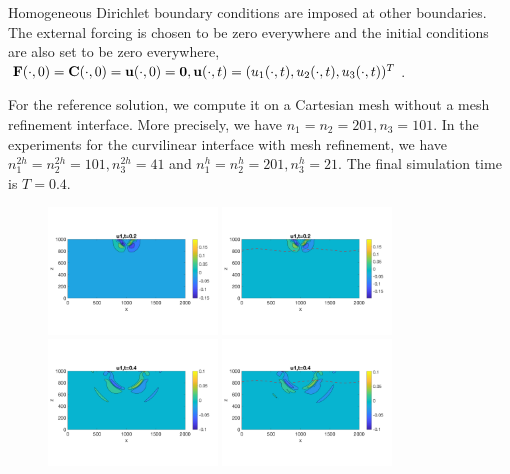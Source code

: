 Homogeneous Dirichlet boundary conditions are imposed at other boundaries. The external forcing is chosen to be zero everywhere and the initial conditions are also set to be zero everywhere, ${\bf F}(\cdot,0) = {\bf C}(\cdot,0) = {\bf u}(\cdot,0) = {\bf 0}, {\bf u}(\cdot,t) = (u_1(\cdot,t), u_2(\cdot,t), u_3(\cdot,t))^T$.

For the reference solution, we compute it on a Cartesian mesh without a mesh refinement interface. More precisely, we have $n_1 = n_2 = 201, n_3 = 101$. In the experiments for the curvilinear interface with mesh refinement, we have $n_1^{2h} = n_2^{2h} = 101, n_3^{2h} = 41$ and $n_1^h = n_2^h = 201, n_3^h = 21$. The final simulation time is $T = 0.4$.

\begin{figure}[htbp]
	\centering
	\includegraphics[width=0.4\textwidth,trim={0 2.8cm 0 2.8cm}, clip]{u1_t02_cartesian.png}
	\includegraphics[width=0.4\textwidth,trim={0 2.8cm 0 2.8cm}, clip]{u1_t02_curvi_mr.png}\\
	\includegraphics[width=0.4\textwidth,trim={0 2.8cm 0 2.8cm}, clip]{u1_t04_cartesian.png}
	\includegraphics[width=0.4\textwidth,trim={0 2.8cm 0 2.8cm}, clip]{u1_t04_curvi_mr.png}

\end{figure}
